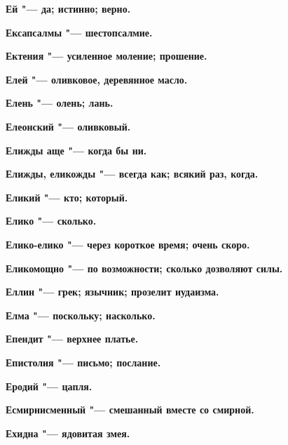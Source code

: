 \bfseries Ей \normalfont{} "--- да; истинно; верно. 




\bfseries Ексапсалмы \normalfont{} "--- шестопсалмие. 




\bfseries Ектения \normalfont{} "--- усиленное моление; прошение. 




\bfseries Елей \normalfont{} "--- оливковое, деревянное масло. 




\bfseries Елень \normalfont{} "--- олень; лань. 




\bfseries Елеонский \normalfont{} "--- оливковый. 




\bfseries Елижды аще \normalfont{} "--- когда бы ни. 




\bfseries Елижды, еликожды \normalfont{} "--- всегда как; всякий раз, когда. 




\bfseries Еликий \normalfont{} "--- кто; который. 




\bfseries Елико \normalfont{} "--- сколько. 




\bfseries Елико-елико \normalfont{} "--- через короткое время; очень скоро. 




\bfseries Еликомощно \normalfont{} "--- по возможности; сколько дозволяют силы. 




\bfseries Еллин \normalfont{} "--- грек; язычник; прозелит иудаизма. 




\bfseries Елма \normalfont{} "--- поскольку; насколько. 




\bfseries Епендит \normalfont{} "--- верхнее платье. 




\bfseries Епистолия \normalfont{} "--- письмо; послание. 




\bfseries Еродий \normalfont{} "--- цапля. 




\bfseries Есмирнисменный \normalfont{} "--- смешанный вместе со смирной. 




\bfseries Ехидна \normalfont{} "--- ядовитая змея. 





